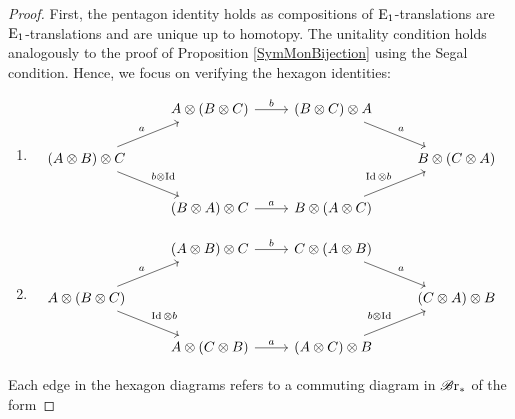\begin{proof}
    First, the pentagon identity holds as compositions of $\operatorname{E}_1$-translations
    are $\operatorname{E}_1$-translations and are unique up to homotopy. The unitality
    condition holds analogously to the proof of Proposition
    \ref{SymMonBijection} using the Segal condition. Hence, we focus on
    verifying the hexagon identities:
    \begin{enumerate}
        \item 
        \[
            \begin{tikzcd}
                                                                                & A \otimes (B \otimes C) \arrow[r, "b"] & (B \otimes C) \otimes A  \arrow[rd, "a"]            &                         \\
            (A \otimes B) \otimes C \arrow[ru, "a"] \arrow[rd, "b \otimes \id"] &                                        &                                                     & B \otimes (C \otimes A) \\
                                                                                & (B \otimes A) \otimes C \arrow[r, "a"] & B \otimes (A \otimes C) \arrow[ru, "\id \otimes b"] &                        
            \end{tikzcd}
        \]
        \item 
        \[
            \begin{tikzcd}
                                                                                & (A \otimes B) \otimes C \arrow[r, "b"] & C \otimes (A \otimes B) \arrow[rd, "a"]             &                         \\
            A \otimes (B \otimes C) \arrow[ru, "a"] \arrow[rd, "\id \otimes b"] &                                        &                                                     & (C \otimes A) \otimes B \\
                                                                                & A \otimes (C \otimes B) \arrow[r, "a"] & (A \otimes C) \otimes B \arrow[ru, "b \otimes \id"] &                        
            \end{tikzcd}
        \]
    \end{enumerate}
    Each edge in the hexagon diagrams refers to a commuting diagram in $\mathscr{B} \text{r}_{\ast}$ of
    the form


\end{proof}
